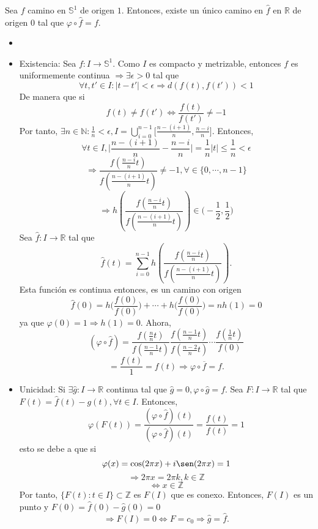\begin{lem}
  Sea $f$ camino en $\mathbb{S}^{1}$ de origen $1$. Entonces, existe un único camino en $\hat{ f }$ en $\mathbb{R}$ de origen $0$ tal que $\varphi \circ \hat{ f } = f$.
\end{lem}

\begin{dem}
  \begin{itemize}
    \item []
    \item Existencia: Sea $f : I \to \mathbb{S}^{1}$. Como $I$ es compacto y metrizable, entonces $f$ es uniformemente continua $\Rightarrow \exists \epsilon > 0$ tal que
      \[
        \forall t, t' \in I : | t - t' | < \epsilon \Rightarrow d(f(t), f(t')) < 1
      \]
       De manera que si
       \[
         f(t) \neq f(t') \Leftrightarrow \frac{f(t)}{f(t')} \neq -1
       \]
       Por tanto, $\exists n \in \mathbb{N} : \frac{1}{n} < \epsilon, I = \bigcup_{i = 0}^{n - 1} \Big [ \frac{n - (i + 1)}{n}, \frac{n - i}{n} \Big ]$. Entonces, 
      \[ 
        \forall t \in I, \Big | \frac{n - (i + 1)}{n} - \frac{n - i}{n} \Big | = \frac{1}{n}| t | \leq \frac{1}{n} < \epsilon  
      \] 
      \[ 
        \Rightarrow \frac{f(\frac{n - i}{n}t)}{f(\frac{n - (i + 1)}{n}t)} \neq -1, \forall \in \{ 0, \cdots,n - 1 \}
      \] 
      \[ 
        \Rightarrow h(\frac{f(\frac{n - i}{n}t)}{f(\frac{n - (i + 1)}{n}t)}) \in \Big ( -\frac{1}{2}, \frac{1}{2} \Big )
      \] 
      Sea $\hat{ f } : I \to \mathbb{R}$ tal que
      \[ 
        \hat{ f }(t) = \sum_{i = 0}^{n - 1} h(\frac{f(\frac{n - i}{n}t)}{f(\frac{n - (i + 1)}{n}t)}).
      \] 
      Esta función es continua entonces, es un camino con origen
      \[ 
        \hat{ f }(0) = h \Big (\frac{f(0)}{f(0)} \Big ) + \cdots + h \Big (\frac{f(0)}{f(0)} \Big ) = n h(1) = 0
      \] 
      ya que $\varphi(0) = 1 \Rightarrow h(1) = 0$. Ahora,
      \[ 
        (\varphi \circ \hat{ f }) = \frac{f(\frac{n}{n}t)}{f(\frac{n - 1}{n}t)} \frac{f(\frac{n - 1}{n}t)}{f(\frac{n - 2}{n}t)} \cdots \frac{f(\frac{1}{n}t)}{f(0)}
      \] 
      \[ 
        = \frac{f(t)}{1} = f(t) \Rightarrow \varphi \circ \overline{f} = f.
      \] 
    \item Unicidad: Si $\exists \hat{ g } : I \to \mathbb{R}$ continua tal que $\hat{ g } = 0, \varphi \circ \hat{ g  } = f$. Sea $F : I \to \mathbb{R}$ tal que $F(t) = \hat{ f }(t) - g(t), \forall t \in I$. Entonces,
      \[ 
        \varphi(F(t)) = \frac{(\varphi \circ \hat{ f })(t)}{(\varphi \circ \hat{ f })(t)} = \frac{f(t)}{f(t)} = 1
      \] 
      esto se debe a que si
      \[
        \varphi(x) = \cos(2 \pi x) + i \sen(2 \pi x) = 1 
      \]
      \[ 
        \Rightarrow 2 \pi x = 2 \pi k, k \in \mathbb{Z} 
      \] 
      \[ 
        \Leftrightarrow x \in \mathbb{Z} 
      \] 
      Por tanto, $\{ F(t) : t \in I \} \subset \mathbb{Z}$ es $F(I)$ que es conexo. Entonces, $F(I)$ es un punto y $F(0) = \hat{ f }(0) - \hat{ g }(0) = 0$
      \[ 
        \Rightarrow F(I) = 0 \Leftrightarrow F = c_{0} \Rightarrow \hat{ g } = \hat{ f }.
      \] 
  \end{itemize}
\end{dem}

